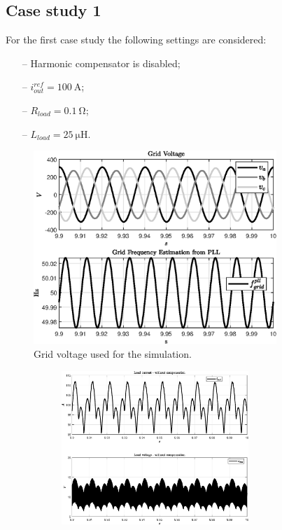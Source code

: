 \documentclass[11pt,a4paper,oneside]{book}
\numberwithin{equation}{section}
\theoremstyle{it}
\theoremstyle{definition}
\begin{document}
\begin{onehalfspace}
\section{Case study 1}
For the first case study the following settings are considered:
\begin{itemize}
	\item[--] Harmonic compensator is disabled;
	\item[--] $i_{out}^{ref}=\SI{100}{\ampere}$;
	\item[--] $R_{load}=\SI{0.1}{\ohm}$;	
	\item[--] $L_{load}=\SI{25}{\micro\henry}$.
\end{itemize}
\begin{figure}[H]
	\centering
	\includegraphics[width = 260pt, angle = 0, 
	keepaspectratio]{figures/sr_without_full_load_1/without_comp_fig_2.eps}
	\captionsetup{width=0.5\textwidth, font=small}	
	\caption{Grid voltage used for the simulation.}
	\label{grid_voltage}
\end{figure}
\begin{figure}[H]
	\centering
	\begin{subfigure}{0.5\textwidth}
		\centering
		\includegraphics[width = 200pt, angle = 0, 
		keepaspectratio]{figures/sr_without_full_load_1/without_comp_fig_4.eps}

\end{subfigure}
\end{figure}
\end{onehalfspace}
\end{document}
